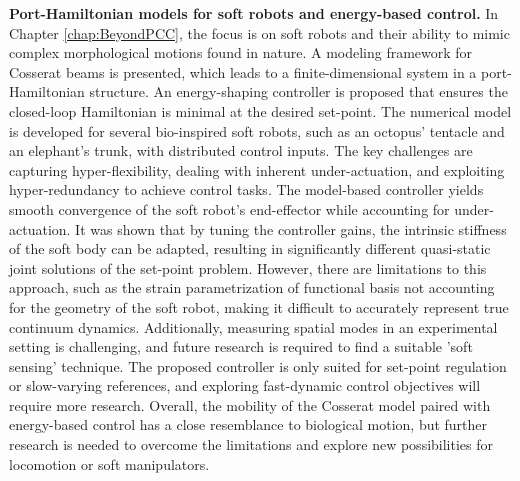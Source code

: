 \noindent \textbf{Port-Hamiltonian models for soft robots and energy-based control.}  In Chapter \ref{chap:BeyondPCC}, the focus is on soft robots and their ability to mimic complex morphological motions found in nature. A modeling framework for Cosserat beams is presented, which leads to a finite-dimensional system in a port-Hamiltonian structure. An energy-shaping controller is proposed that ensures the closed-loop Hamiltonian is minimal at the desired set-point. The numerical model is developed for several bio-inspired soft robots, such as an octopus' tentacle and an elephant's trunk, with distributed control inputs. The key challenges are capturing hyper-flexibility, dealing with inherent under-actuation, and exploiting hyper-redundancy to achieve control tasks. The model-based controller yields smooth convergence of the soft robot's end-effector while accounting for under-actuation. It was shown that by tuning the controller gains, the intrinsic stiffness of the soft body can be adapted, resulting in significantly different quasi-static joint solutions of the set-point problem. However, there are limitations to this approach, such as the strain parametrization of functional basis not accounting for the geometry of the soft robot, making it difficult to accurately represent true continuum dynamics. Additionally, measuring spatial modes in an experimental setting is challenging, and future research is required to find a suitable 'soft sensing' technique. The proposed controller is only suited for set-point regulation or slow-varying references, and exploring fast-dynamic control objectives will require more research. Overall, the mobility of the Cosserat model paired with energy-based control has a close resemblance to biological motion, but further research is needed to overcome the limitations and explore new possibilities for locomotion or soft manipulators.


